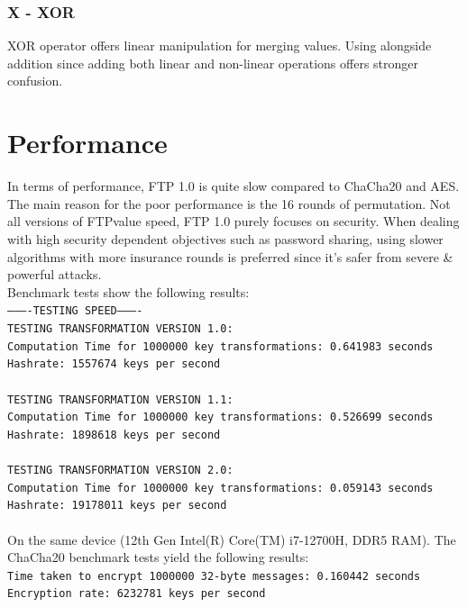 \documentclass[11pt]{article}
\theoremstyle{definition}
\theoremstyle{remark}
\begin{document}
\subsubsection{X - XOR} %

XOR operator offers linear manipulation for merging values. Using alongside addition since adding both linear and non-linear operations offers stronger confusion.

\section{Performance}

In terms of performance, FTP 1.0 is quite slow compared to ChaCha20 and AES. The main reason for the poor performance is the 16 rounds of permutation. Not all versions of FTPvalue speed, FTP 1.0 purely focuses on security. When dealing with high security dependent objectives such as password sharing, using slower algorithms with more insurance rounds is preferred since it's safer from severe \& powerful attacks.
\\
Benchmark tests show the following results: 
\\
\texttt{----------TESTING SPEED----------\\
TESTING TRANSFORMATION VERSION 1.0:\\
Computation Time for 1000000 key transformations: 0.641983 seconds\\
Hashrate: 1557674 keys per second
\\\\
TESTING TRANSFORMATION VERSION 1.1:\\
Computation Time for 1000000 key transformations: 0.526699 seconds\\
Hashrate: 1898618 keys per second
\\\\
TESTING TRANSFORMATION VERSION 2.0:\\
Computation Time for 1000000 key transformations: 0.059143 seconds\\
Hashrate: 19178011 keys per second
}
\\\\
On the same device (12th Gen Intel(R) Core(TM) i7-12700H, DDR5 RAM). The ChaCha20 benchmark tests yield the following results:\\
\texttt{Time taken to encrypt 1000000 32-byte messages: 0.160442 seconds\\
Encryption rate: 6232781 keys per second}\\
\end{document}
